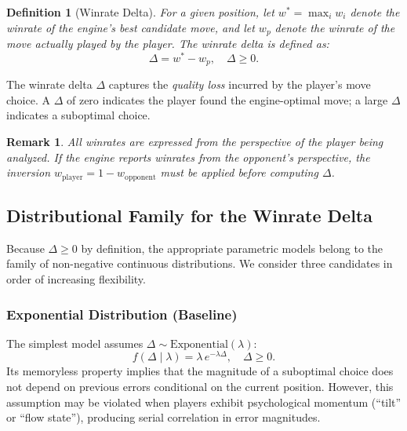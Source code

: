\documentclass[11pt,a4paper]{article}
\newtheorem{definition}{Definition}
\newtheorem{remark}{Remark}
\begin{document}
\begin{definition}[Winrate Delta]
\label{def:delta}
For a given position, let $w^* = \max_i w_i$ denote the winrate of the
engine's best candidate move, and let $w_p$ denote the winrate of the move
actually played by the player. The \emph{winrate delta} is defined as:
\begin{equation}
    \Delta = w^* - w_p, \quad \Delta \geq 0.
    \label{eq:delta}
\end{equation}
\end{definition}

The winrate delta $\Delta$ captures the \emph{quality loss} incurred by the
player's move choice. A $\Delta$ of zero indicates the player found the
engine-optimal move; a large $\Delta$ indicates a suboptimal choice.

\begin{remark}
All winrates are expressed from the perspective of the player being analyzed.
If the engine reports winrates from the opponent's perspective, the inversion
$w_{\text{player}} = 1 - w_{\text{opponent}}$ must be applied before computing
$\Delta$.
\end{remark}

\subsection{Distributional Family for the Winrate Delta}
\label{sec:dist_family}

Because $\Delta \geq 0$ by definition, the appropriate parametric models
belong to the family of non-negative continuous distributions. We consider
three candidates in order of increasing flexibility.

\subsubsection{Exponential Distribution (Baseline)}

The simplest model assumes $\Delta \sim \text{Exponential}(\lambda)$:
\begin{equation}
    f(\Delta \mid \lambda) = \lambda \, e^{-\lambda \Delta}, \quad \Delta \geq 0.
    \label{eq:exponential_pdf}
\end{equation}
Its memoryless property implies that the magnitude of a suboptimal choice does
not depend on previous errors conditional on the current position. However,
this assumption may be violated when players exhibit psychological momentum
(``tilt'' or ``flow state''), producing serial correlation in error magnitudes.
\end{document}

